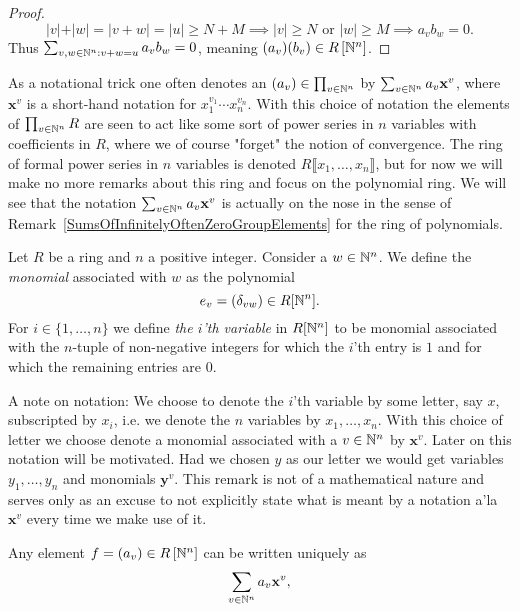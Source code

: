 \begin{proof}
    $$\vert v\vert + \vert w\vert = \vert v +w \vert = \vert u\vert \geq N+M \implies \vert v\vert \geq N \text{ or } \vert w \vert \geq M \implies a_vb_w = 0. $$
    Thus $\sum_{v,w\in \mathbb{N}^n : v+w = u} a_vb_w =  0$, meaning $(a_v)(b_v) \in R\left[\mathbb{N}^n\right]$.
\end{proof}
\begin{remark}
    As a notational trick one often denotes an $(a_v) \in \prod_{v\in \mathbb{N}^n}$ by $\sum_{v\in \mathbb{N}^n} a_v\mathbf{x}^v$, where $\mathbf{x}^v$ is a short-hand notation for $x_1^{v_1}\cdots x_n^{v_n}$. With this choice of notation the elements of $\prod_{v\in \mathbb{N}^n} R$ are seen to act like some sort of power series in $n$ variables with coefficients in $R$, where we of course "forget" the notion of convergence. The ring of formal power series in $n$ variables is denoted $R\llbracket x_1,\dots,x_n\rrbracket$, but for now we will make no more remarks about this ring and focus on the polynomial ring. We will see that the notation $\sum_{v\in \mathbb{N}^n} a_v\mathbf{x}^{v}$ is actually on the nose in the sense of Remark~\ref{SumsOfInfinitelyOftenZeroGroupElements} for the ring of polynomials. 
\end{remark}
\begin{definition}\label{MonomialDefinitionAndVariableDefinition}
    Let $R$ be a ring and $n$ a positive integer. Consider a $w\in\mathbb{N}^n$. We define the \textit{monomial} associated with $w$ as the polynomial 
    $$ e_v=(\delta_{vw})\in R[\mathbb{N}^n].$$
    For $i\in\{1,\dots,n\}$ we define \textit{the $i$'th variable} in $R[\mathbb{N}^n]$ to be monomial associated with the $n$-tuple of non-negative integers for which the $i$'th entry is $1$ and for which the remaining entries are $0$.
\end{definition}
\begin{remark}
    A note on notation: We choose to denote the $i$'th variable by some letter, say $x$, subscripted by $x_i$, i.e. we denote the $n$ variables by $x_1,\dots,x_n$. With this choice of letter we choose denote a monomial associated with a $v\in \mathbb{N}^n$ by $\mathbf{x}^v$. Later on this notation will be motivated. Had we chosen $y$ as our letter we would get variables $y_1,\dots,y_n$ and monomials $\mathbf{y}^v$. This remark is not of a mathematical nature and serves only as an excuse to not explicitly state what is meant by a notation a'la $\mathbf{x}^v$ every time we make use of it.    
\end{remark}
\begin{lemma}
    Any element $f=(a_v)\in R\left[\mathbb{N}^n\right]$ can be written uniquely as 
    $$\sum_{v\in \mathbb{N}^n} a_v\mathbf{x}^v,$$
\end{lemma}
